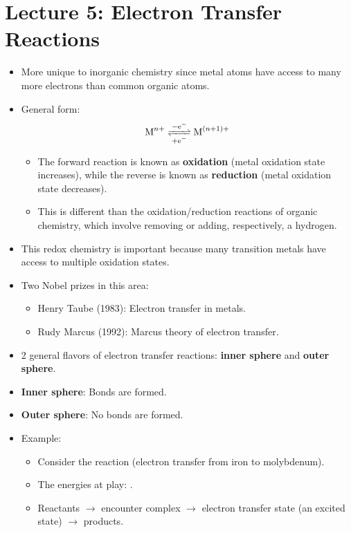 \documentclass[../notes.tex]{subfiles}
\begin{document}
\section{Lecture 5: Electron Transfer Reactions}
\begin{itemize}
    \item {}More unique to inorganic chemistry since metal atoms have access to many more electrons than common organic atoms.
    \item General form:
    \begin{equation*}
        \ce{M^n+ <=>[$-\e[-]$][$+\e[-]$] M^{(n+1)+}}
    \end{equation*}
    \begin{itemize}
        \item The forward reaction is known as \textbf{oxidation} (metal oxidation state increases), while the reverse is known as \textbf{reduction} (metal oxidation state decreases).
        \item This is different than the oxidation/reduction reactions of organic chemistry, which involve removing or adding, respectively, a hydrogen.
    \end{itemize}
    \item This redox chemistry is important because many transition metals have access to multiple oxidation states.
    \item Two Nobel prizes in this area:
    \begin{itemize}
        \item Henry Taube (1983): Electron transfer in metals.
        \item Rudy Marcus (1992): Marcus theory of electron transfer.
    \end{itemize}
    \item 2 general flavors of electron transfer reactions: \textbf{inner sphere} and \textbf{outer sphere}.
    \item \textbf{Inner sphere}: Bonds are formed.
    \item \textbf{Outer sphere}: No bonds are formed.
    \item Example:
    \begin{itemize}
        \item Consider the reaction  (electron transfer from iron to molybdenum).
        \item The energies at play: .
        \item Reactants $\to$ encounter complex $\to$ electron transfer state (an excited state) $\to$ products.

\end{itemize}
\end{itemize}
\end{document}
